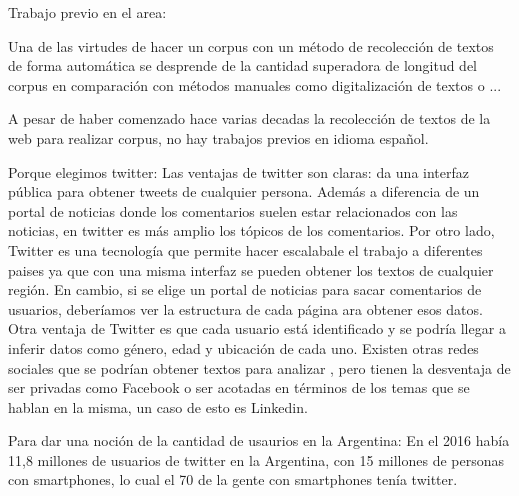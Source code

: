 
Trabajo previo en el area:


Una de las virtudes de hacer un corpus con un método de recolección de textos de forma automática se desprende de la cantidad superadora de longitud del corpus en comparación con métodos manuales como digitalización de textos o ...

A pesar de haber comenzado hace varias decadas la recolección de textos de la web para realizar corpus, no hay trabajos previos en idioma español.

Porque elegimos twitter:
Las ventajas de twitter son claras: da una interfaz pública para obtener tweets de cualquier persona. Además a diferencia de un portal de noticias donde los comentarios suelen estar relacionados con las noticias, en twitter es más amplio los tópicos de los comentarios.
Por otro lado, Twitter es una tecnología que permite hacer escalabale el trabajo a diferentes paises ya que con una misma interfaz se pueden obtener los textos de cualquier región. En cambio, si se elige un portal de noticias para sacar comentarios de usuarios, deberíamos ver la estructura de cada página ara obtener esos datos.
Otra ventaja de Twitter es que cada usuario está identificado y se podría llegar a inferir datos como género, edad y ubicación de cada uno.
Existen otras redes sociales que se podrían obtener textos para analizar , pero tienen la desventaja de ser privadas como Facebook o ser acotadas en términos de los temas que se hablan en la misma, un caso de esto es Linkedin. 


Para dar una noción de la cantidad de usaurios en la Argentina:
En el 2016 había 11,8 millones de usuarios de twitter en la Argentina, con 15 millones de personas con smartphones, lo cual el 70 de la gente con smartphones tenía twitter.
